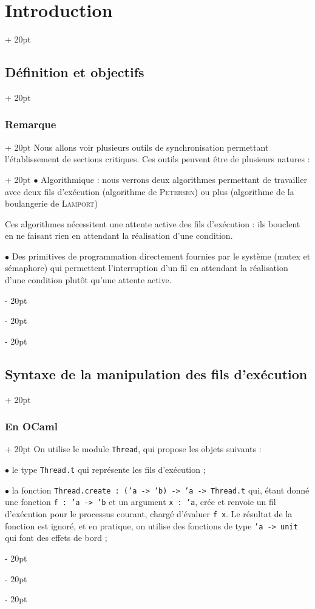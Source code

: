 \documentclass[a4paper, 12pt, twoside]{article}
\newcommand{\ind}[1][20pt]{\advance\leftskip + #1}
\newcommand{\deind}[1][20pt]{\advance\leftskip - #1}
\newenvironment{indt}[2][20pt]{#2 \par \ind[#1]}{\par \deind} %
\begin{document}
\begin{indt}{\section{Introduction}}
\begin{indt}{\subsection{Définition et objectifs}}
            \begin{indt}{\subsubsection{Remarque}}
                Nous allons voir plusieurs outils de synchronisation permettant l'établissement de sections critiques.
                \begin{indt}{Ces outils peuvent être de plusieurs natures :}
                    $\bullet$ Algorithmique : nous verrons deux algorithmes permettant de travailler avec deux fils d'exécution (algorithme de \textsc{Petersen}) ou plus (algorithme de la boulangerie de \textsc{Lamport})

                    Ces algorithmes nécessitent une attente active des fils d'exécution : ils bouclent en ne faisant rien en attendant la réalisation d'une condition.

                    $\bullet$ Des primitives de programmation directement fournies par le système (mutex et sémaphore) qui permettent l'interruption d'un fil en attendant la réalisation d'une condition plutôt qu'une attente active.
                \end{indt}
            \end{indt}
        \end{indt}

        \vspace{12pt}
        
        \begin{indt}{\subsection{Syntaxe de la manipulation des fils d'exécution}}
            \begin{indt}{\subsubsection{En OCaml}}
                On utilise le module \texttt{Thread}, qui propose les objets suivants :

                $\bullet$ le type \texttt{Thread.t} qui représente les fils d'exécution ;

                $\bullet$ la fonction \texttt{Thread.create : ('a -> 'b) -> 'a -> Thread.t} qui, étant donné une fonction \texttt{f : 'a -> 'b} et un argument \texttt{x : 'a}, crée et renvoie un fil d'exécution pour le processus courant, chargé d'évaluer \texttt{f x}.
                Le résultat de la fonction est ignoré, et en pratique, on utilise des fonctions de type \texttt{'a -> unit} qui font des effets de bord ;


\end{indt}
\end{indt}
\end{indt}
\end{document}
